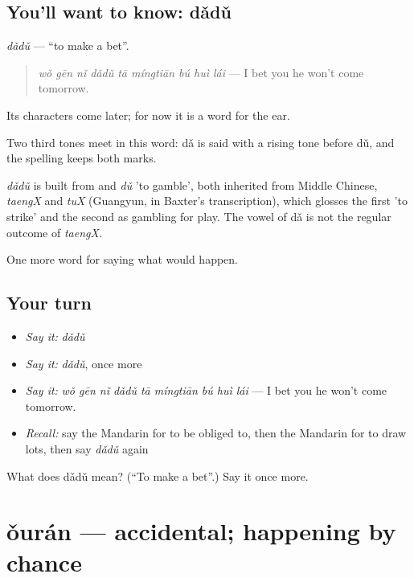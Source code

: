 \subsection*{You'll want to know: dǎdǔ}
\emph{dǎdǔ} — \textquotedblleft{}to make a bet\textquotedblright{}.

\begin{quote}
\emph{wǒ gēn nǐ dǎdǔ tā míngtiān bú huì lái} — I bet you he won't come tomorrow.
\end{quote}

Its characters come later; for now it is a word for the ear.

Two third tones meet in this word: dǎ is said with a rising tone before dǔ, and the spelling keeps both marks.

\begin{cousinweb}
\emph{dǎdǔ} is built from  and \emph{dǔ} 'to gamble', both inherited from Middle Chinese, \emph{taengX} and \emph{tuX} (Guangyun, in Baxter's transcription), which glosses the first 'to strike' and the second as gambling for play. The vowel of dǎ is not the regular outcome of \emph{taengX}.
\end{cousinweb}

\begin{grammarlens}[title={What you've built}]
One more word for saying what would happen.
\end{grammarlens}

\subsection*{Your turn}
\begin{itemize}
\raggedright
  \item \emph{Say it:} \emph{dǎdǔ}
  \item \emph{Say it:} \emph{dǎdǔ}, once more
  \item \emph{Say it:} \emph{wǒ gēn nǐ dǎdǔ tā míngtiān bú huì lái} — I bet you he won't come tomorrow.
  \item \emph{Recall:} say the Mandarin for to be obliged to, then the Mandarin for to draw lots, then say \emph{dǎdǔ} again
\end{itemize}

\begin{tcolorbox}[breakable,colback=teal!4,colframe=teal!35!black,title={Before you move on}]
What does dǎdǔ mean? (\textquotedblleft{}To make a bet\textquotedblright{}.) Say it once more.
\end{tcolorbox}
\section[ǒurán]{ǒurán — accidental; happening by chance}

